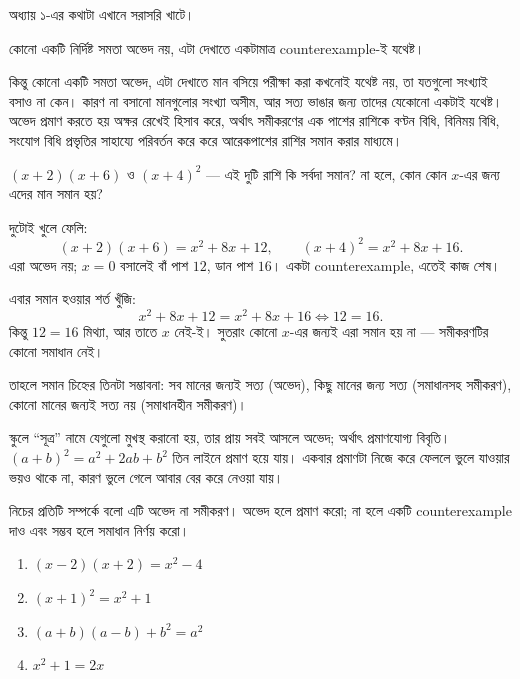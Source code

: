 \documentclass[11pt]{article}
\begin{document}
\begin{idea}[প্রমাণ ও খণ্ডন এখানে অসমান কাজ]
অধ্যায় ১-এর কথাটা এখানে সরাসরি খাটে।

কোনো একটি নির্দিষ্ট সমতা অভেদ নয়, এটা দেখাতে একটামাত্র counterexample-ই যথেষ্ট।

কিন্তু কোনো একটি সমতা অভেদ, এটা দেখাতে মান বসিয়ে পরীক্ষা করা কখনোই
যথেষ্ট নয়, তা যতগুলো সংখ্যাই বসাও না কেন। কারণ না বসানো মানগুলোর সংখ্যা অসীম, আর সত্য ভাঙার
জন্য তাদের যেকোনো একটাই যথেষ্ট। অভেদ প্রমাণ করতে হয় অক্ষর রেখেই হিসাব করে, অর্থাৎ সমীকরণের এক পাশের রাশিকে বণ্টন বিধি, বিনিময় বিধি, সংযোগ বিধি প্রভৃতির সাহায্যে পরিবর্তন করে করে আরেকপাশের রাশির সমান করার মাধ্যমে।
\end{idea}

\begin{example}
$(x+2)(x+6)$ ও $(x+4)^2$ --- এই দুটি রাশি কি সর্বদা সমান? না হলে, কোন কোন $x$-এর জন্য এদের মান সমান হয়?
\end{example}

\begin{solbox}
দুটোই খুলে ফেলি:
\[
  (x+2)(x+6) = x^2 + 8x + 12, \qquad (x+4)^2 = x^2 + 8x + 16 .
\]
এরা অভেদ নয়; $x = 0$ বসালেই বাঁ পাশ $12$, ডান পাশ $16$। একটা counterexample, এতেই 
কাজ শেষ।

এবার সমান হওয়ার শর্ত খুঁজি:
\[
  x^2 + 8x + 12 = x^2 + 8x + 16 \iff 12 = 16 .
\]
কিন্তু $12 = 16$ মিথ্যা, আর তাতে $x$ নেই-ই। সুতরাং কোনো $x$-এর জন্যই এরা সমান
হয় না --- সমীকরণটির কোনো সমাধান নেই।

তাহলে সমান চিহ্নের তিনটা সম্ভাবনা: সব মানের জন্যই সত্য (অভেদ), কিছু মানের জন্য সত্য (সমাধানসহ
সমীকরণ), কোনো মানের জন্যই সত্য নয় (সমাধানহীন সমীকরণ)।
\end{solbox}

\begin{remark}
স্কুলে ``সূত্র'' নামে যেগুলো মুখস্থ করানো হয়, তার প্রায় সবই আসলে অভেদ;
অর্থাৎ প্রমাণযোগ্য বিবৃতি। $(a+b)^2 = a^2 + 2ab + b^2$ তিন
লাইনে প্রমাণ হয়ে যায়। একবার প্রমাণটা নিজে করে ফেললে ভুলে যাওয়ার ভয়ও থাকে না,
কারণ ভুলে গেলে আবার বের করে নেওয়া যায়। 
\end{remark}

 নিচের প্রতিটি সম্পর্কে বলো এটি অভেদ না সমীকরণ। অভেদ হলে প্রমাণ করো;
না হলে একটি counterexample দাও এবং সম্ভব হলে সমাধান নির্ণয় করো।
\begin{enumerate}
  \item $(x-2)(x+2) = x^2 - 4$
  \item $(x+1)^2 = x^2 + 1$
  \item $(a+b)(a-b) + b^2 = a^2$
  \item $x^2 + 1 = 2x$
\end{enumerate}
\end{document}

